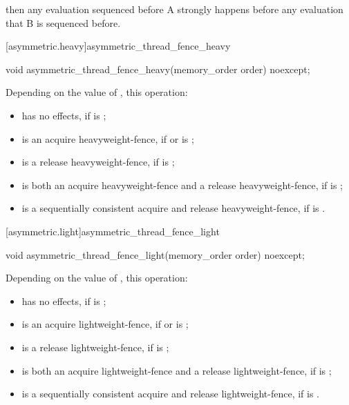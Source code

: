 then any evaluation sequenced before A strongly happens before any evaluation that B is
sequenced before.


[asymmetric.heavy]{asymmetric_thread_fence_heavy}
\begin{itemdecl}
void asymmetric_thread_fence_heavy(memory_order order) noexcept;
\end{itemdecl}

\begin{itemdescr}


\pnum
\effects
Depending on the value of , this operation:
\begin{itemize}
    \item  has no effects, if  is ;
\item  is an acquire heavyweight-fence, if  or  is ;
\item is a release heavyweight-fence, if  is ;
\item is both an acquire heavyweight-fence and a release heavyweight-fence, if  is ;
\item is a sequentially consistent acquire and release heavyweight-fence, if  is .
\end{itemize}

\end{itemdescr}

[asymmetric.light]{asymmetric_thread_fence_light}
\begin{itemdecl}
void asymmetric_thread_fence_light(memory_order order) noexcept;
\end{itemdecl}

\begin{itemdescr}


\pnum
\effects
Depending on the value of , this operation:
\begin{itemize}
    \item  has no effects, if  is ;
\item  is an acquire lightweight-fence, if  or  is ;
\item is a release lightweight-fence, if  is ;
\item is both an acquire lightweight-fence and a release lightweight-fence, if  is ;
\item is a sequentially consistent acquire and release lightweight-fence, if  is .
\end{itemize}

\end{itemdescr}



